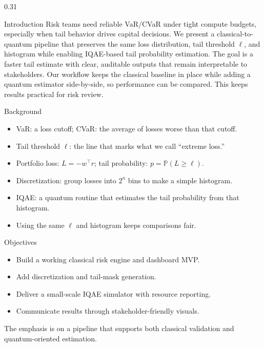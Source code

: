 \documentclass[final]{beamer}
\begin{document}
\begin{frame}[t]
\begin{columns}[t,totalwidth=\linewidth]

\begin{column}{0.31\linewidth}
\begin{block}{Introduction}
Risk teams need reliable VaR/CVaR under tight compute budgets, especially when tail behavior drives capital decisions. We present a classical-to-quantum pipeline that preserves the same loss distribution, tail threshold $\ell$, and histogram while enabling IQAE-based tail probability estimation. The goal is a faster tail estimate with clear, auditable outputs that remain interpretable to stakeholders. Our workflow keeps the classical baseline in place while adding a quantum estimator side-by-side, so performance can be compared. This keeps results practical for risk review.
\end{block}

\begin{block}{Background}
\begin{itemize}
    \item VaR: a loss cutoff; CVaR: the average of losses worse than that cutoff.
    \item Tail threshold $\ell$: the line that marks what we call “extreme loss.”
    \item Portfolio loss: $L = -w^\top r$; tail probability: $p = \mathbb{P}(L \ge \ell)$.
    \item Discretization: group losses into $2^n$ bins to make a simple histogram.
    \item IQAE: a quantum routine that estimates the tail probability from that histogram.
    \item Using the same $\ell$ and histogram keeps comparisons fair.
\end{itemize}
\end{block}

\begin{block}{Objectives}
\begin{itemize}
    \item Build a working classical risk engine and dashboard MVP.
    \item Add discretization and tail-mask generation.
    \item Deliver a small-scale IQAE simulator with resource reporting.
    \item Communicate results through stakeholder-friendly visuals.
\end{itemize}
\vspace{0.3em}
The emphasis is on a pipeline that supports both classical validation and quantum-oriented estimation.
\end{block}


\end{column}
\end{columns}
\end{frame}
\end{document}
